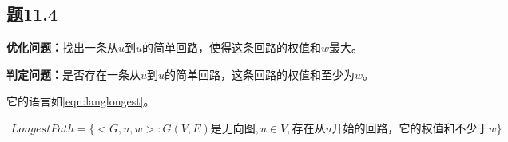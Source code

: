 \documentclass[a4paper,twoside]{article}
\begin{document}
\begin{spacing}{1.2}
\section{题11.4}

\textbf{优化问题：}找出一条从$u$到$u$的简单回路，使得这条回路的权值和$w$最大。

\textbf{判定问题：}是否存在一条从$u$到$u$的简单回路，这条回路的权值和至少为$w$。

它的语言如\eqref{eqn:langlongest}。

\begin{equation}
	\label{eqn:langlongest}
	\begin{aligned}
		LongestPath=\{ <G,u,w>: G(V,E)\mbox{是无向图}, u\in V, \mbox{存在从}u\mbox{开始的回路，它的权值和不少于}w \}
	\end{aligned}
\end{equation}


\end{spacing}
\end{document}
